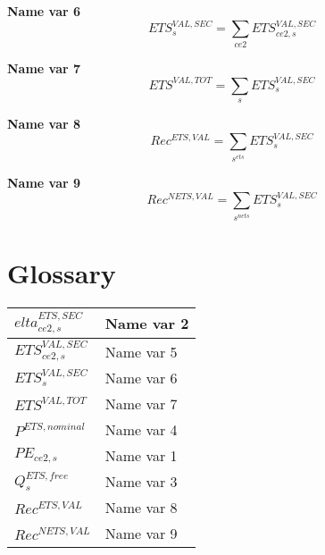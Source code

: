 \documentclass[12pt]{article}
\numberwithin{equation}{section}
\begin{document}
\noindent\textbf{Name var 6} \\
\begin{dmath}
ETS^{VAL,SEC}_{s} = \sum_{ce2} ETS^{VAL,SEC}_{ce2, s}
\end{dmath}


\noindent\textbf{Name var 7} \\
\begin{dmath}
ETS^{VAL,TOT} = \sum_{s} ETS^{VAL,SEC}_{s}
\end{dmath}


\noindent\textbf{Name var 8} \\
\begin{dmath}
Rec^{ETS,VAL} = \sum_{s^{ets}} ETS^{VAL,SEC}_{s}
\end{dmath}


\noindent\textbf{Name var 9} \\
\begin{dmath}
Rec^{NETS,VAL} = \sum_{s^{nets}} ETS^{VAL,SEC}_{s}
\end{dmath}























\newpage
        \section{Glossary}
        \normalsize
        \begin{longtable}{@{}p{4cm}p{9cm}@{}} 
$elta^{ETS,SEC}_{ce2, s}$ & Name var 2 \\
 \midrule 
$ETS^{VAL,SEC}_{ce2, s}$ & Name var 5 \\
 \midrule 
$ETS^{VAL,SEC}_{s}$ & Name var 6 \\
 \midrule 
$ETS^{VAL,TOT}$ & Name var 7 \\
 \midrule 
$P^{ETS,nominal}$ & Name var 4 \\
 \midrule 
$PE_{ce2, s}$ & Name var 1 \\
 \midrule 
$Q^{ETS,free}_{s}$ & Name var 3 \\
 \midrule 
$Rec^{ETS,VAL}$ & Name var 8 \\
 \midrule 
$Rec^{NETS,VAL}$ & Name var 9 \\
\end{longtable}
\end{document}

